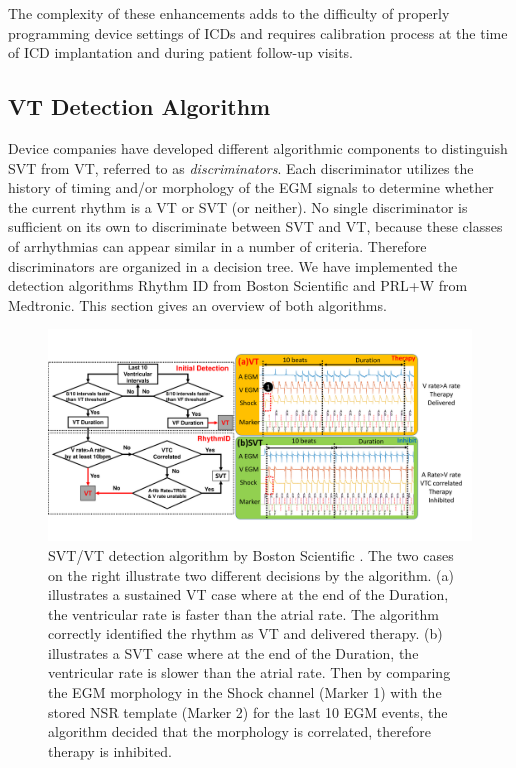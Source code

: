 The complexity of these enhancements adds to the difficulty of properly programming device settings of ICDs and requires calibration process at the time of ICD implantation and during patient follow-up visits.
\subsection{VT Detection Algorithm}
\label{sec:svtvt}
Device companies have developed different algorithmic components to distinguish SVT from VT, referred to as \emph{discriminators}. 
Each discriminator utilizes the history of timing and/or morphology of the EGM signals to determine whether the current rhythm is a VT or SVT (or neither).
No single discriminator is sufficient on its own to discriminate between SVT and VT, because these classes of arrhythmias can appear similar in a number of criteria.
Therefore discriminators are organized in a decision tree.%
We have implemented the detection algorithms Rhythm ID from Boston Scientific and PRL+W from Medtronic. 
This section gives an overview of both algorithms.


\begin{figure}[t]
	\centering
	\includegraphics[scale=0.4]{figs/BS_det.pdf}
	\caption{\small SVT/VT detection algorithm by Boston Scientific \cite{compass}. The two cases on the right illustrate two different decisions by the algorithm. (a) illustrates a sustained VT case where at the end of the Duration, the ventricular rate is faster than the atrial rate. The algorithm correctly identified the rhythm as VT and delivered therapy. (b) illustrates a SVT case where at the end of the Duration, the ventricular rate is slower than the atrial rate. Then by comparing the EGM morphology in the Shock channel (Marker 1) with the stored NSR template (Marker 2) for the last 10 EGM events, the algorithm decided that the morphology is correlated, therefore therapy is inhibited.}
	\label{fig:BS_det}
\end{figure}

